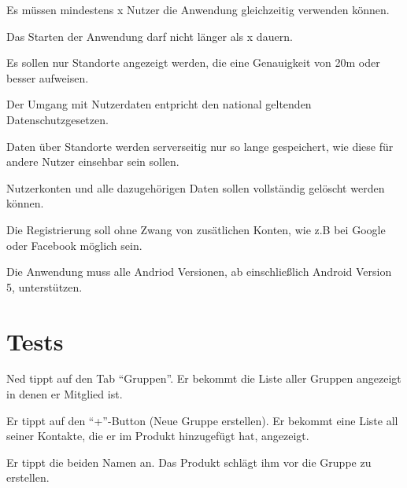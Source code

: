 \documentclass[parskip=full,11pt]{scrartcl}
\begin{document}
Es müssen mindestens x Nutzer die Anwendung gleichzeitig verwenden können.  %

Das Starten der Anwendung darf nicht länger als x dauern.   %

Es sollen nur Standorte angezeigt werden, die eine Genauigkeit von 20m oder besser aufweisen.

Der Umgang mit Nutzerdaten entpricht den national geltenden Datenschutzgesetzen.

Daten über Standorte werden serverseitig nur so lange gespeichert, wie diese für andere Nutzer einsehbar sein sollen.

Nutzerkonten und alle dazugehörigen Daten sollen vollständig gelöscht werden können.

Die Registrierung soll ohne Zwang von zusätlichen Konten, wie z.B bei Google oder Facebook möglich sein.

Die Anwendung muss alle Andriod Versionen, ab einschließlich Android Version 5, unterstützen.



\section{Tests}


{Ned tippt auf den Tab  \enquote{Gruppen}.}
{Er bekommt die Liste aller Gruppen angezeigt in denen er Mitglied ist.}

{Er tippt auf den \enquote{+}-Button (Neue Gruppe erstellen).}
{Er bekommt eine Liste all seiner Kontakte, die er im Produkt hinzugefügt hat, angezeigt.}

{Er tippt die beiden Namen an.}
{Das Produkt schlägt ihm vor die Gruppe zu erstellen.}
\end{document}
